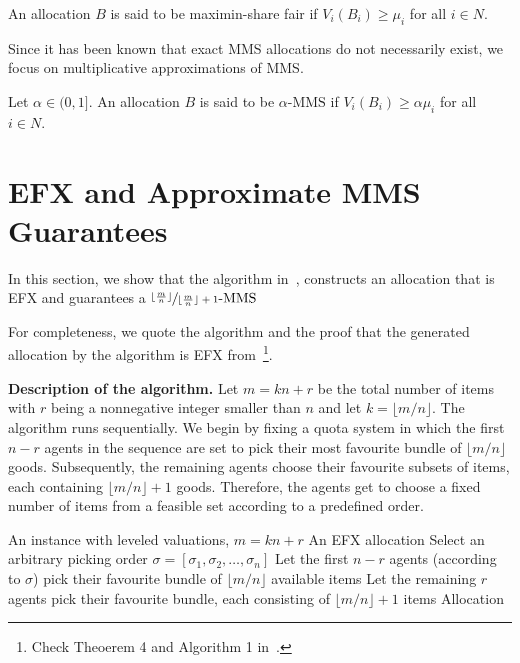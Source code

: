 \documentclass{article}
\theoremstyle{definition}
\begin{document}
\begin{definition}
    An allocation $B$ is said to be maximin-share fair if $V_i(B_i) \ge \mu_i$ for all $i \in N$.
\end{definition}

Since it has been known that exact MMS allocations do not necessarily exist, we focus on multiplicative approximations of MMS.

\begin{definition}
    Let $\alpha \in (0, 1]$. An allocation $B$ is said to be $\alpha\text{-MMS}$ if $V_i(B_i) \ge \alpha\mu_i$ for all $i \in N$.
\end{definition}



\section{EFX and Approximate MMS Guarantees}

In this section, we show that the algorithm in~\cite{christodoulou2024fairtruthfulallocationsleveled}, constructs an allocation that is EFX and guarantees a $\sfrac{\lfloor\frac{m}{n}\rfloor}{\lfloor\frac{m}{n}\rfloor + 1}\text{-MMS}$

For completeness, we quote the algorithm and the proof that the generated allocation by the algorithm is EFX from~\cite{christodoulou2024fairtruthfulallocationsleveled}\footnote{Check Theoerem 4 and Algorithm 1 in~\cite{christodoulou2024fairtruthfulallocationsleveled}.}. 

\textbf{Description of the algorithm.}
Let $m = kn + r$ be the total number of items with $r$ being a nonnegative integer smaller than $n$ and let $k = \lfloor m/n \rfloor$. The algorithm runs sequentially. We begin by fixing a quota system in which the first $n - r$ agents in the sequence are set to pick their most favourite bundle of $\lfloor m/n \rfloor$ goods. Subsequently, the remaining agents choose their favourite subsets of items, each containing $\lfloor m/n \rfloor + 1$ goods. Therefore, the agents get to choose a fixed number of items from a feasible set according to a predefined order.

\begin{algorithm} 
\caption{EFX under Leveled Valuations}
\begin{algorithmic}[1] \label{alg}
    \REQUIRE An instance with leveled valuations, $m = kn + r$
    \ENSURE An EFX allocation
    \STATE Select an arbitrary picking order $\sigma = [\sigma_1, \sigma_2, \dots, \sigma_n]$
    \STATE Let the first $n - r$ agents (according to $\sigma$) pick their favourite bundle of $\lfloor m/n \rfloor$ available items
    \STATE Let the remaining $r$ agents pick their favourite bundle, each consisting of $\lfloor m/n \rfloor + 1$ items
    \RETURN Allocation
\end{algorithmic}
\end{algorithm}
\end{document}

